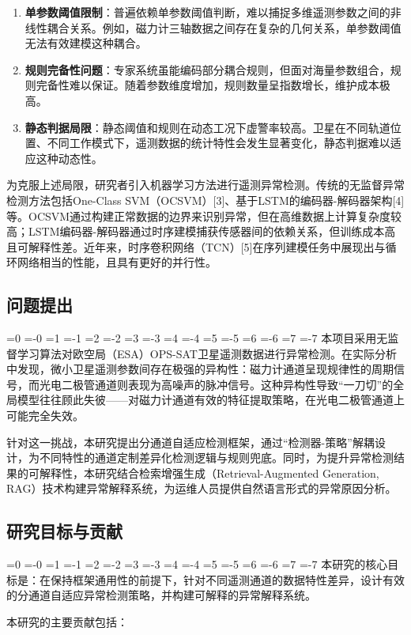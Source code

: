 \documentclass[12pt, a4paper]{article}
\newcommand{\zihao}[1]{%
    \ifnum#1=0 {\fontsize{42pt}{50pt}\selectfont}%
    \else\ifnum#1=-0 {\fontsize{36pt}{44pt}\selectfont}%
    \else\ifnum#1=1 {\fontsize{26pt}{32pt}\selectfont}%
    \else\ifnum#1=-1 {\fontsize{24pt}{28pt}\selectfont}%
    \else\ifnum#1=2 {\fontsize{22pt}{26pt}\selectfont}%
    \else\ifnum#1=-2 {\fontsize{18pt}{22pt}\selectfont}%
    \else\ifnum#1=3 {\fontsize{16pt}{20pt}\selectfont}%
    \else\ifnum#1=-3 {\fontsize{15pt}{18pt}\selectfont}%
    \else\ifnum#1=4 {\fontsize{14pt}{17pt}\selectfont}%
    \else\ifnum#1=-4 {\fontsize{12pt}{15pt}\selectfont}%
    \else\ifnum#1=5 {\fontsize{10.5pt}{13pt}\selectfont}%
    \else\ifnum#1=-5 {\fontsize{9pt}{11pt}\selectfont}%
    \else\ifnum#1=6 {\fontsize{7.5pt}{9pt}\selectfont}%
    \else\ifnum#1=-6 {\fontsize{6.5pt}{8pt}\selectfont}%
    \else\ifnum#1=7 {\fontsize{5.5pt}{7pt}\selectfont}%
    \else\ifnum#1=-7 {\fontsize{5pt}{6pt}\selectfont}%
    \fi\fi\fi\fi\fi\fi\fi\fi\fi\fi\fi\fi\fi\fi\fi\fi
}
\newcommand{\songti}{\CJKfontspec{SimSun}}
\begin{document}
\begin{enumerate}[label=(\arabic*)]
    \item \textbf{单参数阈值限制}：普遍依赖单参数阈值判断，难以捕捉多维遥测参数之间的非线性耦合关系。例如，磁力计三轴数据之间存在复杂的几何关系，单参数阈值无法有效建模这种耦合。
    \item \textbf{规则完备性问题}：专家系统虽能编码部分耦合规则，但面对海量参数组合，规则完备性难以保证。随着参数维度增加，规则数量呈指数增长，维护成本极高。
    \item \textbf{静态判据局限}：静态阈值和规则在动态工况下虚警率较高。卫星在不同轨道位置、不同工作模式下，遥测数据的统计特性会发生显著变化，静态判据难以适应这种动态性。
\end{enumerate}

为克服上述局限，研究者引入机器学习方法进行遥测异常检测。传统的无监督异常检测方法包括One-Class SVM（OCSVM）[3]、基于LSTM的编码器-解码器架构[4]等。OCSVM通过构建正常数据的边界来识别异常，但在高维数据上计算复杂度较高；LSTM编码器-解码器通过时序建模捕获传感器间的依赖关系，但训练成本高且可解释性差。近年来，时序卷积网络（TCN）[5]在序列建模任务中展现出与循环网络相当的性能，且具有更好的并行性。

\subsection{问题提出}

\zihao{5}\songti
本项目采用无监督学习算法对欧空局（ESA）OPS-SAT卫星遥测数据进行异常检测。在实际分析中发现，微小卫星遥测参数间存在极强的异构性：磁力计通道呈现规律性的周期信号，而光电二极管通道则表现为高噪声的脉冲信号。这种异构性导致``一刀切''的全局模型往往顾此失彼——对磁力计通道有效的特征提取策略，在光电二极管通道上可能完全失效。

针对这一挑战，本研究提出分通道自适应检测框架，通过``检测器-策略''解耦设计，为不同特性的通道定制差异化检测逻辑与规则兜底。同时，为提升异常检测结果的可解释性，本研究结合检索增强生成（Retrieval-Augmented Generation, RAG）技术构建异常解释系统，为运维人员提供自然语言形式的异常原因分析。

\subsection{研究目标与贡献}

\zihao{5}\songti
本研究的核心目标是：在保持框架通用性的前提下，针对不同遥测通道的数据特性差异，设计有效的分通道自适应异常检测策略，并构建可解释的异常解释系统。

本研究的主要贡献包括：
\end{document}
